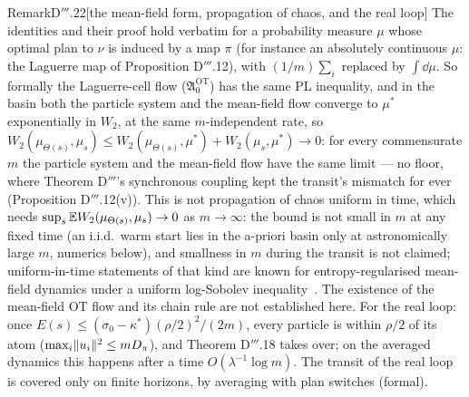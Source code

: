 \begin{rmk}{Remark}{D$'''$.22}[the mean-field form, propagation of chaos, and the real loop]
The identities and their proof hold verbatim for a probability measure $\mu$ whose optimal plan to $\nu$ is induced by
a map $\pi$ (for instance an absolutely continuous $\mu$: the Laguerre map of Proposition D$'''$.12), with
$(1/m)\sum_i$ replaced by $\int\dd\mu$. So formally the Laguerre-cell flow \textup{($\mathfrak{A}_0^{\mathrm{OT}}$)}
has the same PL inequality, and in the basin both the particle system and the mean-field flow converge to $\mu^*$
exponentially in $W_2$, at the same $m$-independent rate, so
$W_2(\mu_{\Theta(s)},\mu_s)\le W_2(\mu_{\Theta(s)},\mu^*) + W_2(\mu_s,\mu^*)\to0$: for every commensurate $m$ the
particle system and the mean-field flow have the same limit --- no floor, where Theorem D$'''$'s synchronous coupling
kept the transit's mismatch for ever (Proposition D$'''$.12(v)). This is not propagation of chaos uniform in time,
which needs $\sup_s\mathbb{E} W_2(\mu_{\Theta(s)},\mu_s)\to0$ as $m\to\infty$: the bound is not small in $m$ at any fixed
time (an i.i.d.\ warm start lies in the a-priori basin only at astronomically large $m$, numerics below), and
smallness in $m$ during the transit is not claimed; uniform-in-time statements of that kind are known for
entropy-regularised mean-field dynamics under a uniform log-Sobolev inequality~\cite{S50}. The existence of the
mean-field OT flow and its chain rule are not established here. For the real loop: once
$E(s)\le(\sigma_0 - \kappa^*)(\rho/2)^2/(2m)$, every particle is within $\rho/2$ of its atom
($\max_i\lVert u_i\rVert^2\le mD_\pi$), and Theorem D$'''$.18 takes over; on the averaged dynamics this happens after a
time $O(\lambda^{-1}\log m)$. The transit of the real loop is covered only on finite horizons, by averaging with plan
switches (formal).
\end{rmk}
